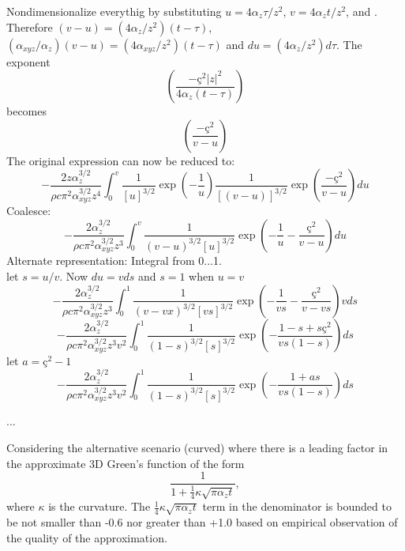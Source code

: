 \documentclass[letterpaper]{article}
\newcommand{\cedilla}{\text{\c{c}}}
\begin{document}
Nondimensionalize everythig by substituting $u=4\alpha_{z}\tau/z^{2}$, $v=4\alpha_{z} t/z^{2}$,  and . Therefore
$(v-u)=(4\alpha_{z}/z^{2})(t-\tau)$, $(\alpha_{xyz}/\alpha_{z})(v-u)=(4\alpha_{xyz}/z^{2})(t-\tau)$ and $du=(4\alpha_{z}/z^{2})d\tau$.
The exponent
\begin{equation}
\left(\frac{-\cedilla^{2} |z|^{2}}{4 \alpha_{z} (t-\tau)}\right)
\end{equation}
becomes
\begin{equation}
\left(\frac{-\cedilla^{2}}{v-u}\right)
\end{equation}
The original expression can now be reduced to:
\begin{equation}
-\frac{2 z\alpha_{z}^{3/2}}{\rho c\pi^{2}\alpha_{xyz}^{3/2}z^{4}} \int_{0}^{v}\frac{1}{\left[u\right]^{3/2}}\exp\left(-\frac{1}{u}\right)\frac{1}{\left[(v-u)\right]^{3/2}}\exp\left(\frac{-\cedilla^{2}}{v-u}\right) du
\end{equation}
Coalesce:
\begin{equation}
-\frac{2 \alpha_{z}^{3/2}}{\rho c\pi^{2}\alpha_{xyz}^{3/2}z^{3}} \int_{0}^{v}\frac{1}{(v-u)^{3/2}\left[u\right]^{3/2}}\exp\left(-\frac{1}{u} - \frac{\cedilla^{2}}{v-u}\right) du
\end{equation}
Alternate representation: Integral from 0...1.\\
let $s=u/v$. Now $du = v ds$ and $s=1$ when $u=v$
\begin{equation}
-\frac{2 \alpha_{z}^{3/2}}{\rho c\pi^{2}\alpha_{xyz}^{3/2}z^{3}} \int_{0}^{1}\frac{1}{(v-vx)^{3/2}\left[vs\right]^{3/2}}\exp\left(-\frac{1}{vs} - \frac{\cedilla^{2}}{v-vs}\right) v ds
\end{equation}
\begin{equation}
-\frac{2 \alpha_{z}^{3/2}}{\rho c\pi^{2}\alpha_{xyz}^{3/2}z^{3}v^{2}} \int_{0}^{1}\frac{1}{(1-s)^{3/2}\left[s\right]^{3/2}}\exp\left(-\frac{1-s + s\cedilla^{2}}{vs(1-s)}\right) ds
\end{equation}
let $a=\cedilla^{2}-1$
\begin{equation}
-\frac{2 \alpha_{z}^{3/2}}{\rho c\pi^{2}\alpha_{xyz}^{3/2}z^{3}v^{2}} \int_{0}^{1}\frac{1}{(1-s)^{3/2}\left[s\right]^{3/2}}\exp\left(-\frac{1 + as}{vs(1-s)}\right) ds
\end{equation}

...

Considering the alternative scenario (curved) where there
is a leading factor in the approximate 3D Green's function of the form
\[
\frac{1}{1+\frac{1}{4}\kappa \sqrt{\pi\alpha_{z}t}},
\]
where $\kappa$ is the curvature. The $\frac{1}{4}\kappa \sqrt{\pi\alpha_{z}t}$ term in the denominator is bounded to be not smaller than -0.6 nor greater than +1.0 based on empirical observation of the quality of the approximation. 
\end{document}
